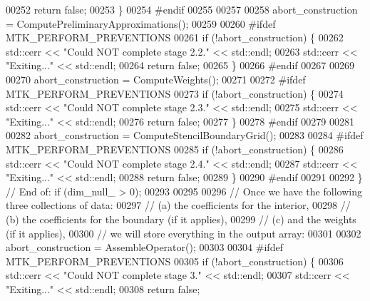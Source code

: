 \begin{DoxyCode}
{{00252       \textcolor{keywordflow}{return} \textcolor{keyword}{false};
00253     \}
00254 \textcolor{preprocessor}{    #endif}
00255 
00257 
00258     abort\_construction = ComputePreliminaryApproximations();
00259 
00260 \textcolor{preprocessor}{    #ifdef MTK\_PERFORM\_PREVENTIONS}
00261     \textcolor{keywordflow}{if} (!abort\_construction) \{
00262       std::cerr << \textcolor{stringliteral}{"Could NOT complete stage 2.2."} << std::endl;
00263       std::cerr << \textcolor{stringliteral}{"Exiting..."} << std::endl;
00264       \textcolor{keywordflow}{return} \textcolor{keyword}{false};
00265     \}
00266 \textcolor{preprocessor}{    #endif}
00267 
00269 
00270     abort\_construction = ComputeWeights();
00271 
00272 \textcolor{preprocessor}{    #ifdef MTK\_PERFORM\_PREVENTIONS}
00273     \textcolor{keywordflow}{if} (!abort\_construction) \{
00274       std::cerr << \textcolor{stringliteral}{"Could NOT complete stage 2.3."} << std::endl;
00275       std::cerr << \textcolor{stringliteral}{"Exiting..."} << std::endl;
00276       \textcolor{keywordflow}{return} \textcolor{keyword}{false};
00277     \}
00278 \textcolor{preprocessor}{    #endif}
00279 
00281 
00282     abort\_construction = ComputeStencilBoundaryGrid();
00283 
00284 \textcolor{preprocessor}{    #ifdef MTK\_PERFORM\_PREVENTIONS}
00285     \textcolor{keywordflow}{if} (!abort\_construction) \{
00286       std::cerr << \textcolor{stringliteral}{"Could NOT complete stage 2.4."} << std::endl;
00287       std::cerr << \textcolor{stringliteral}{"Exiting..."} << std::endl;
00288       \textcolor{keywordflow}{return} \textcolor{keyword}{false};
00289     \}
00290 \textcolor{preprocessor}{    #endif}
00291 
00292   \} \textcolor{comment}{// End of: if (dim\_null\_ > 0);}
00293 
00295 
00296   \textcolor{comment}{// Once we have the following three collections of data:}
00297   \textcolor{comment}{//   (a) the coefficients for the interior,}
00298   \textcolor{comment}{//   (b) the coefficients for the boundary (if it applies),}
00299   \textcolor{comment}{//   (c) and the weights (if it applies),}
00300   \textcolor{comment}{// we will store everything in the output array:}
00301 
00302   abort\_construction = AssembleOperator();
00303 
00304 \textcolor{preprocessor}{  #ifdef MTK\_PERFORM\_PREVENTIONS}
00305   \textcolor{keywordflow}{if} (!abort\_construction) \{
00306     std::cerr << \textcolor{stringliteral}{"Could NOT complete stage 3."} << std::endl;
00307     std::cerr << \textcolor{stringliteral}{"Exiting..."} << std::endl;
00308     \textcolor{keywordflow}{return} \textcolor{keyword}{false};
}}
\end{DoxyCode}
